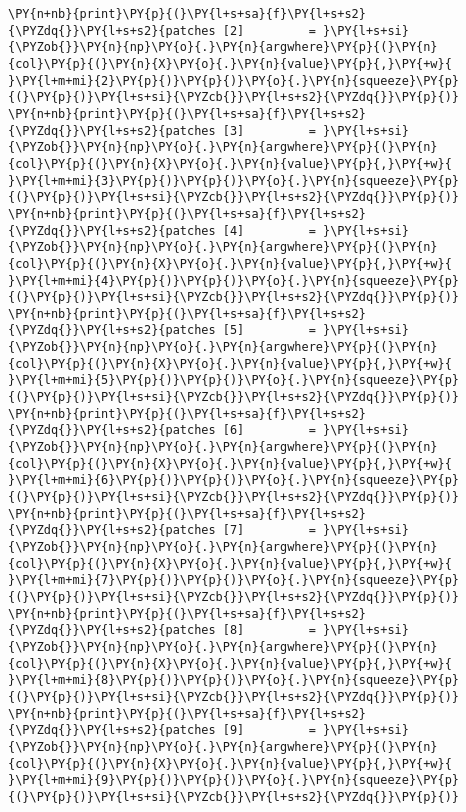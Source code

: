 \begin{tcolorbox}[breakable, size=fbox, boxrule=1pt, pad at break*=1mm,colback=cellbackground, colframe=cellborder]
\begin{Verbatim}[commandchars=\\\{\}]
\PY{n+nb}{print}\PY{p}{(}\PY{l+s+sa}{f}\PY{l+s+s2}{\PYZdq{}}\PY{l+s+s2}{patches [2]         = }\PY{l+s+si}{\PYZob{}}\PY{n}{np}\PY{o}{.}\PY{n}{argwhere}\PY{p}{(}\PY{n}{col}\PY{p}{(}\PY{n}{X}\PY{o}{.}\PY{n}{value}\PY{p}{,}\PY{+w}{ }\PY{l+m+mi}{2}\PY{p}{)}\PY{p}{)}\PY{o}{.}\PY{n}{squeeze}\PY{p}{(}\PY{p}{)}\PY{l+s+si}{\PYZcb{}}\PY{l+s+s2}{\PYZdq{}}\PY{p}{)}
\PY{n+nb}{print}\PY{p}{(}\PY{l+s+sa}{f}\PY{l+s+s2}{\PYZdq{}}\PY{l+s+s2}{patches [3]         = }\PY{l+s+si}{\PYZob{}}\PY{n}{np}\PY{o}{.}\PY{n}{argwhere}\PY{p}{(}\PY{n}{col}\PY{p}{(}\PY{n}{X}\PY{o}{.}\PY{n}{value}\PY{p}{,}\PY{+w}{ }\PY{l+m+mi}{3}\PY{p}{)}\PY{p}{)}\PY{o}{.}\PY{n}{squeeze}\PY{p}{(}\PY{p}{)}\PY{l+s+si}{\PYZcb{}}\PY{l+s+s2}{\PYZdq{}}\PY{p}{)}
\PY{n+nb}{print}\PY{p}{(}\PY{l+s+sa}{f}\PY{l+s+s2}{\PYZdq{}}\PY{l+s+s2}{patches [4]         = }\PY{l+s+si}{\PYZob{}}\PY{n}{np}\PY{o}{.}\PY{n}{argwhere}\PY{p}{(}\PY{n}{col}\PY{p}{(}\PY{n}{X}\PY{o}{.}\PY{n}{value}\PY{p}{,}\PY{+w}{ }\PY{l+m+mi}{4}\PY{p}{)}\PY{p}{)}\PY{o}{.}\PY{n}{squeeze}\PY{p}{(}\PY{p}{)}\PY{l+s+si}{\PYZcb{}}\PY{l+s+s2}{\PYZdq{}}\PY{p}{)}
\PY{n+nb}{print}\PY{p}{(}\PY{l+s+sa}{f}\PY{l+s+s2}{\PYZdq{}}\PY{l+s+s2}{patches [5]         = }\PY{l+s+si}{\PYZob{}}\PY{n}{np}\PY{o}{.}\PY{n}{argwhere}\PY{p}{(}\PY{n}{col}\PY{p}{(}\PY{n}{X}\PY{o}{.}\PY{n}{value}\PY{p}{,}\PY{+w}{ }\PY{l+m+mi}{5}\PY{p}{)}\PY{p}{)}\PY{o}{.}\PY{n}{squeeze}\PY{p}{(}\PY{p}{)}\PY{l+s+si}{\PYZcb{}}\PY{l+s+s2}{\PYZdq{}}\PY{p}{)}
\PY{n+nb}{print}\PY{p}{(}\PY{l+s+sa}{f}\PY{l+s+s2}{\PYZdq{}}\PY{l+s+s2}{patches [6]         = }\PY{l+s+si}{\PYZob{}}\PY{n}{np}\PY{o}{.}\PY{n}{argwhere}\PY{p}{(}\PY{n}{col}\PY{p}{(}\PY{n}{X}\PY{o}{.}\PY{n}{value}\PY{p}{,}\PY{+w}{ }\PY{l+m+mi}{6}\PY{p}{)}\PY{p}{)}\PY{o}{.}\PY{n}{squeeze}\PY{p}{(}\PY{p}{)}\PY{l+s+si}{\PYZcb{}}\PY{l+s+s2}{\PYZdq{}}\PY{p}{)}
\PY{n+nb}{print}\PY{p}{(}\PY{l+s+sa}{f}\PY{l+s+s2}{\PYZdq{}}\PY{l+s+s2}{patches [7]         = }\PY{l+s+si}{\PYZob{}}\PY{n}{np}\PY{o}{.}\PY{n}{argwhere}\PY{p}{(}\PY{n}{col}\PY{p}{(}\PY{n}{X}\PY{o}{.}\PY{n}{value}\PY{p}{,}\PY{+w}{ }\PY{l+m+mi}{7}\PY{p}{)}\PY{p}{)}\PY{o}{.}\PY{n}{squeeze}\PY{p}{(}\PY{p}{)}\PY{l+s+si}{\PYZcb{}}\PY{l+s+s2}{\PYZdq{}}\PY{p}{)}
\PY{n+nb}{print}\PY{p}{(}\PY{l+s+sa}{f}\PY{l+s+s2}{\PYZdq{}}\PY{l+s+s2}{patches [8]         = }\PY{l+s+si}{\PYZob{}}\PY{n}{np}\PY{o}{.}\PY{n}{argwhere}\PY{p}{(}\PY{n}{col}\PY{p}{(}\PY{n}{X}\PY{o}{.}\PY{n}{value}\PY{p}{,}\PY{+w}{ }\PY{l+m+mi}{8}\PY{p}{)}\PY{p}{)}\PY{o}{.}\PY{n}{squeeze}\PY{p}{(}\PY{p}{)}\PY{l+s+si}{\PYZcb{}}\PY{l+s+s2}{\PYZdq{}}\PY{p}{)}
\PY{n+nb}{print}\PY{p}{(}\PY{l+s+sa}{f}\PY{l+s+s2}{\PYZdq{}}\PY{l+s+s2}{patches [9]         = }\PY{l+s+si}{\PYZob{}}\PY{n}{np}\PY{o}{.}\PY{n}{argwhere}\PY{p}{(}\PY{n}{col}\PY{p}{(}\PY{n}{X}\PY{o}{.}\PY{n}{value}\PY{p}{,}\PY{+w}{ }\PY{l+m+mi}{9}\PY{p}{)}\PY{p}{)}\PY{o}{.}\PY{n}{squeeze}\PY{p}{(}\PY{p}{)}\PY{l+s+si}{\PYZcb{}}\PY{l+s+s2}{\PYZdq{}}\PY{p}{)}

\end{Verbatim}
\end{tcolorbox}
